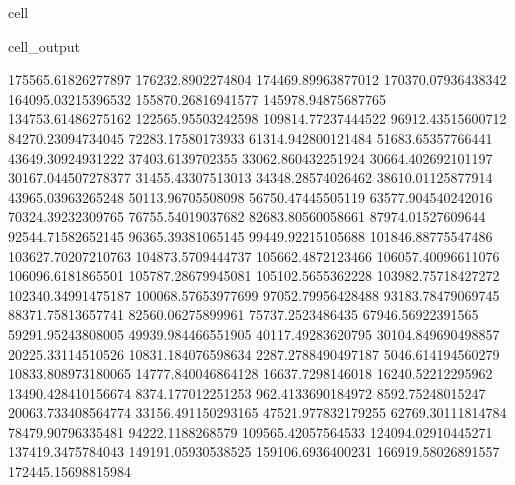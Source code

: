 \documentclass[letterpaper,10pt,english]{jupyterBook}
\begin{document}
\begin{sphinxuseclass}{cell}
\begin{sphinxVerbatimOutput}
\begin{sphinxuseclass}{cell_output}
\begin{sphinxVerbatim}[commandchars=\\\{\}]
175565.61826277897  176232.8902274804  174469.89963877012  170370.07936438342  164095.03215396532  155870.26816941577  145978.94875687765  134753.61486275162  122565.95503242598  109814.77237444522  96912.43515600712  84270.23094734045  72283.17580173933  61314.942800121484  51683.65357766441  43649.30924931222  37403.6139702355  33062.860432251924  30664.402692101197  30167.044507278377  31455.43307513013  34348.28574026462  38610.01125877914  43965.03963265248  50113.96705508098  56750.47445505119  63577.904540242016  70324.39232309765  76755.54019037682  82683.80560058661  87974.01527609644  92544.71582652145  96365.39381065145  99449.92215105688  101846.88775547486  103627.70207210763  104873.5709444737  105662.4872123466  106057.40096611076  106096.6181865501  105787.28679945081  105102.5655362228  103982.75718427272  102340.34991475187  100068.57653977699  97052.79956428488  93183.78479069745  88371.75813657741  82560.06275899961  75737.2523486435  67946.56922391565  59291.95243808005  49939.984466551905  40117.49283620795  30104.849690498857  20225.33114510526  10831.184076598634  2287.2788490497187  \PYGZhy{}5046.614194560279  \PYGZhy{}10833.808973180065  \PYGZhy{}14777.840046864128  \PYGZhy{}16637.7298146018  \PYGZhy{}16240.52212295962  \PYGZhy{}13490.428410156674  \PYGZhy{}8374.177012251253  \PYGZhy{}962.4133690184972  8592.75248015247  20063.733408564774  33156.491150293165  47521.977832179255  62769.30111814784  78479.90796335481  94222.1188268579  109565.42057564533  124094.02910445271  137419.3475784043  149191.05930538525  159106.6936400231  166919.58026891557  172445.15698815984  

\end{sphinxVerbatim}
\end{sphinxuseclass}
\end{sphinxVerbatimOutput}
\end{sphinxuseclass}
\end{document}
